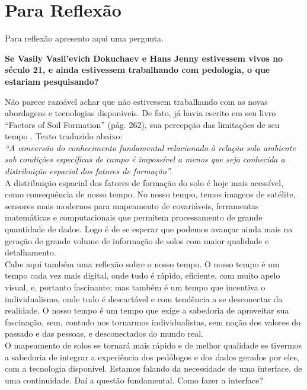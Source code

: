 \section{Para Reflexão}
Para reflexão apresento aqui uma pergunta.
\begin{center}
\textbf{Se Vasily Vasil'evich Dokuchaev e Hans Jenny estivessem vivos no século 21, e ainda estivessem trabalhando com pedologia, o que estariam pesquisando?} 
\end{center}
Não parece razoável achar que não estivessem trabalhando com as novas abordagens e tecnologias disponíveis. De fato, \cite{Jenny:1941} já havia escrito em seu livro ``Factors of Soil Formation'' (pág. 262), sua percepção das limitações de seu tempo \citep{ScullEtAl:2003}. Texto traduzido abaixo:\\
\emph{``A conversão do conhecimento fundamental relacionado à relação solo ambiente sob condições específicas de campo é impossível a menos que seja conhecida a distribuição espacial dos fatores de formação''.}\\
A distribuição espacial dos fatores de formação do solo é hoje mais acessível, como consequência de nosso tempo. No nosso tempo, temos imagens de satélite, sensores mais modernos para mapeamento de covariáveis, ferramentas matemáticas e computacionais que permitem processamento de grande quantidade de dados. Logo é de se esperar que podemos avançar ainda mais na geração de grande volume de informação de solos com maior qualidade e detalhamento.\\
Cabe aqui também uma reflexão sobre o nosso tempo. O nosso tempo é um tempo cada vez mais digital, onde tudo é rápido, eficiente, com muito apelo visual, e, portanto fascinante; mas também é um tempo que incentiva o individualismo, onde tudo é descartável e com tendência a se desconectar da realidade. O nosso tempo é um tempo que exige a sabedoria de aproveitar sua fascinação, sem, contudo nos tornarmos individualistas, sem noção dos valores do passado e das pessoas, e desconectados do mundo real.\\
O mapeamento de solos se tornará mais rápido e de melhor qualidade se tivermos a sabedoria de integrar a experiência dos pedólogos e dos dados gerados por eles, com a tecnologia disponível. Estamos falando da necessidade de uma interface, de uma continuidade. Daí a questão fundamental. Como fazer a interface?
